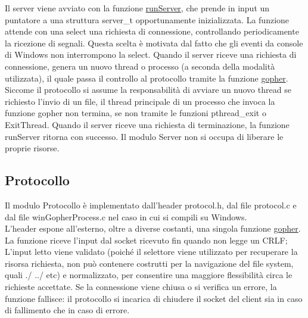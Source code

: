 \documentclass{article}
\begin{document}
Il server viene avviato con la funzione \href{}{runServer},
che prende in input un puntatore a una struttura server\_t opportunamente inizializzata.
La funzione attende con una select una richiesta di connessione, controllando periodicamente la ricezione
di segnali. Questa scelta è motivata dal fatto che gli eventi da console di Windows non interrompono la select.
Quando il server riceve una richiesta di connessione, genera un nuovo thread o processo (a seconda della modalità
utilizzata), il quale passa il controllo al protocollo tramite la funzione \href{}
{gopher}. Siccome il protocollo si assume la responsabilità di avviare un nuovo thread se richiesto
l'invio di un file, il thread principale di un processo che invoca la funzione gopher non termina,
se non tramite le funzioni pthread\_exit o ExitThread. Quando il server riceve una richiesta di terminazione, 
la funzione runServer ritorna con successo. Il modulo Server non si occupa di liberare le proprie risorse.

\subsection{Protocollo}

Il modulo Protocollo è implementato dall'header protocol.h, dal file protocol.c e dal file winGopherProcess.c 
nel caso in cui si compili su Windows.\\
L'header espone all'esterno, oltre a diverse costanti, una singola funzione \href{}{gopher}.
La funzione riceve l'input dal socket ricevuto fin quando non legge un CRLF;
L'input letto viene validato (poiché il selettore viene utilizzato per recuperare la risorsa
richiesta, non può contenere costrutti per la navigazione del file system, quali ./ ../ etc) e normalizzato,
per consentire una maggiore flessibilità circa le richieste accettate.
Se la connessione viene chiusa o si verifica un errore, la funzione fallisce:
il protocollo si incarica di chiudere il socket del client sia in caso di fallimento che in caso di errore.
\end{document}
